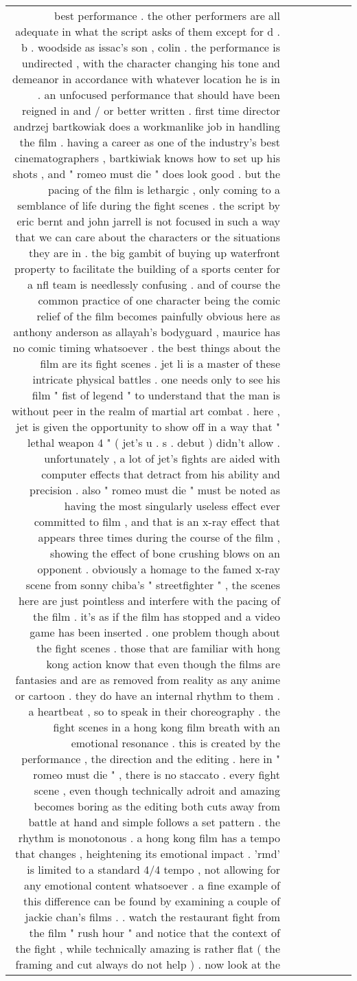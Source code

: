 \begin{tabular}{rlrrrlr}
best performance .  the other performers are all adequate in what the script asks of them except for d . b . woodside as issac's son , colin .  the performance is undirected , with the character changing his tone and demeanor in accordance with whatever location he is in .  an unfocused performance that should have been reigned in and / or better written .  first time director andrzej bartkowiak does a workmanlike job in handling the film .  having a career as one of the industry's best cinematographers , bartkiwiak knows how to set up his shots , and " romeo must die " does look good .  but the pacing of the film is lethargic , only coming to a semblance of life during the fight scenes .  the script by eric bernt and john jarrell is not focused in such a way that we can care about the characters or the situations they are in .  the big gambit of buying up waterfront property to facilitate the building of a sports center for a nfl team is needlessly confusing .  and of course the common practice of one character being the comic relief of the film becomes painfully obvious here as anthony anderson as allayah's bodyguard , maurice has no comic timing whatsoever .  the best things about the film are its fight scenes .  jet li is a master of these intricate physical battles .  one needs only to see his film " fist of legend " to understand that the man is without peer in the realm of martial art combat .  here , jet is given the opportunity to show off in a way that " lethal weapon 4 " ( jet's u . s . debut ) didn't allow .  unfortunately , a lot of jet's fights are aided with computer effects that detract from his ability and precision .  also " romeo must die " must be noted as having the most singularly useless effect ever committed to film , and that is an x-ray effect that appears three times during the course of the film , showing the effect of bone crushing blows on an opponent .  obviously a homage to the famed x-ray scene from sonny chiba's " streetfighter " , the scenes here are just pointless and interfere with the pacing of the film .  it's as if the film has stopped and a video game has been inserted .  one problem though about the fight scenes .  those that are familiar with hong kong action know that even though the films are fantasies and are as removed from reality as any anime or cartoon .  they do have an internal rhythm to them .  a heartbeat , so to speak in their choreography .  the fight scenes in a hong kong film breath with an emotional resonance .  this is created by the performance , the direction and the editing .  here in " romeo must die " , there is no staccato .  every fight scene , even though technically adroit and amazing becomes boring as the editing both cuts away from battle at hand and simple follows a set pattern .  the rhythm is monotonous .  a hong kong film has a tempo that changes , heightening its emotional impact .  'rmd' is limited to a standard 4/4 tempo , not allowing for any emotional content whatsoever .  a fine example of this difference can be found by examining a couple of jackie chan's films . .  watch the restaurant fight from the film " rush hour " and notice that the context of the fight , while technically amazing is rather flat ( the framing and cut always do not help ) .  now look at the 
\end{tabular}
